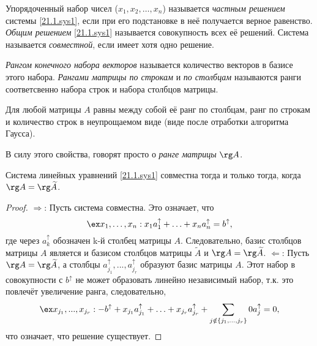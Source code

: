   \begin{defn}
  Упорядоченный набор чисел ($x_1, x_2, \ldots, x_n$) называется \textit{частным решением} системы \eqref{21.1.sys1}, если при его подстановке в неё получается верное равенство. \textit{Общим решением} \eqref{21.1.sys1} называется совокупность всех её решений. Система называется \textit{совместной}, если имеет хотя одно решение.
  \end{defn}
  \begin{defn}
  \textit{Рангом конечного набора векторов} называется количество векторов в базисе этого набора. \textit{Рангами матрицы по строкам} и \textit{по столбцам} называются ранги соответсвенно набора строк и набора столбцов матрицы.
  \end{defn}
  \begin{lemm} 
  Для любой матрицы $A$ равны между собой её ранг по столбцам, ранг по строкам и количество строк в неупрощаемом виде (виде после отработки алгоритма Гаусса).
  \end{lemm}
  В силу этого свойства, говорят просто о \textit{ранге матрицы} $\rg A$.
  \begin{thm}
  Система линейных уравнений \eqref{21.1.sys1} совместна тогда и только тогда, когда $\rg A = \rg \widetilde A$.
  \end{thm}
  \begin{proof}
  $\Rightarrow$: Пусть система совместна. Это означает, что
  \begin{equation*}
  \ex x_1,\ldots, x_n: x_1a_1^\uparrow +\ldots+x_na_n^\uparrow=b^\uparrow,
  \end{equation*}
  где через $a_k^\uparrow$ обозначен k-й столбец матрицы $A$. Следовательно, базис столбцов матрицы $A$  является и базисом столбцов матрицы $\widetilde A$ и $\rg A = \rg \widetilde A$.
  $\Leftarrow$: Пусть $\rg A = \rg \widetilde A$, а столбцы $a_{j_1}^\uparrow,...,a_{j_r}^\uparrow$ образуют базис матрицы $A$. Этот набор в совокупности с $b^\uparrow$ не может образовать линейно независимый набор, т.к. это повлечёт увеличение ранга, следовательно, 
  \begin{equation*}\\ 
  \ex x_{j_1},...,x_{j_r}: -b^\uparrow+x_{j_1}a_{j_1}^\uparrow+\ldots+x_{j_r}a_{j_r}^\uparrow+\sum_{j \notin \{j_1,...,j_r\}}0 a_j^\uparrow = 0,
  \end{equation*} 
  что означает, что решение существует.
  \end{proof}
